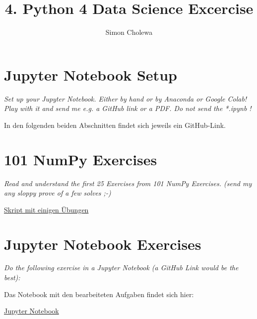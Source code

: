 \documentclass[11pt,a4paper]{article}
\author{Simon Cholewa}
\title{4. Python 4 Data Science Excercise}
\begin{document}
\maketitle

\section{Jupyter Notebook Setup}
\textit{Set up your Jupyter Notebook. Either by hand or by Anaconda or Google Colab! Play with it and send me e.g. a GitHub link or a PDF.
Do not send the *.ipynb !}

In den folgenden beiden Abschnitten findet sich jeweils ein GitHub-Link.
   
\section{101 NumPy Exercises}
\textit{Read and understand the first 25 Exercises from 101 NumPy Exercises. (send my any sloppy prove of a few solves ;-)}

\href{https://github.com/grutzwurst/Data_Science/blob/EA_04/EA_04/101.py}{Skript mit einigen Übungen}



\section{Jupyter Notebook Exercises}
\textit{Do the following exercise in a Jupyter Notebook (a GitHub Link would be the best):}

Das Notebook mit den bearbeiteten Aufgaben findet sich hier: 

\href{https://github.com/grutzwurst/Data_Science/blob/EA_04/EA_04/Aufg4.ipynb}{Jupyter Notebook}
\end{document}
